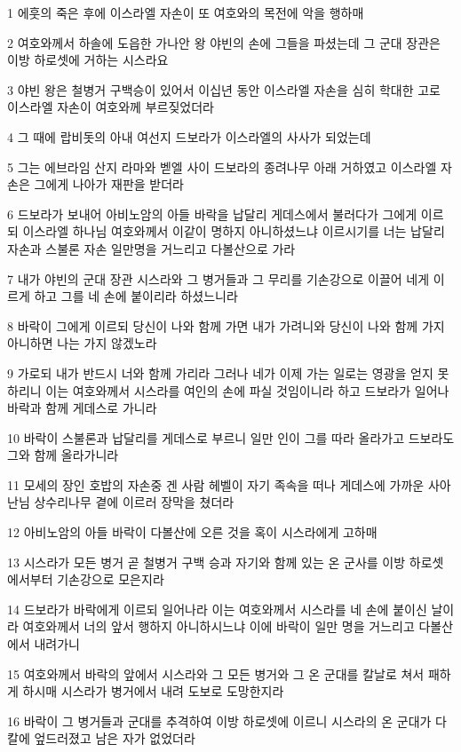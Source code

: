 \par 1 에훗의 죽은 후에 이스라엘 자손이 또 여호와의 목전에 악을 행하매
\par 2 여호와께서 하솔에 도읍한 가나안 왕 야빈의 손에 그들을 파셨는데 그 군대 장관은 이방 하로셋에 거하는 시스라요
\par 3 야빈 왕은 철병거 구백승이 있어서 이십년 동안 이스라엘 자손을 심히 학대한 고로 이스라엘 자손이 여호와께 부르짖었더라
\par 4 그 때에 랍비돗의 아내 여선지 드보라가 이스라엘의 사사가 되었는데
\par 5 그는 에브라임 산지 라마와 벧엘 사이 드보라의 종려나무 아래 거하였고 이스라엘 자손은 그에게 나아가 재판을 받더라
\par 6 드보라가 보내어 아비노암의 아들 바락을 납달리 게데스에서 불러다가 그에게 이르되 이스라엘 하나님 여호와께서 이같이 명하지 아니하셨느냐 이르시기를 너는 납달리 자손과 스불론 자손 일만명을 거느리고 다볼산으로 가라
\par 7 내가 야빈의 군대 장관 시스라와 그 병거들과 그 무리를 기손강으로 이끌어 네게 이르게 하고 그를 네 손에 붙이리라 하셨느니라
\par 8 바락이 그에게 이르되 당신이 나와 함께 가면 내가 가려니와 당신이 나와 함께 가지 아니하면 나는 가지 않겠노라
\par 9 가로되 내가 반드시 너와 함께 가리라 그러나 네가 이제 가는 일로는 영광을 얻지 못하리니 이는 여호와께서 시스라를 여인의 손에 파실 것임이니라 하고 드보라가 일어나 바락과 함께 게데스로 가니라
\par 10 바락이 스불론과 납달리를 게데스로 부르니 일만 인이 그를 따라 올라가고 드보라도 그와 함께 올라가니라
\par 11 모세의 장인 호밥의 자손중 겐 사람 헤벨이 자기 족속을 떠나 게데스에 가까운 사아난님 상수리나무 곁에 이르러 장막을 쳤더라
\par 12 아비노암의 아들 바락이 다볼산에 오른 것을 혹이 시스라에게 고하매
\par 13 시스라가 모든 병거 곧 철병거 구백 승과 자기와 함께 있는 온 군사를 이방 하로셋에서부터 기손강으로 모은지라
\par 14 드보라가 바락에게 이르되 일어나라 이는 여호와께서 시스라를 네 손에 붙이신 날이라 여호와께서 너의 앞서 행하지 아니하시느냐 이에 바락이 일만 명을 거느리고 다볼산에서 내려가니
\par 15 여호와께서 바락의 앞에서 시스라와 그 모든 병거와 그 온 군대를 칼날로 쳐서 패하게 하시매 시스라가 병거에서 내려 도보로 도망한지라
\par 16 바락이 그 병거들과 군대를 추격하여 이방 하로셋에 이르니 시스라의 온 군대가 다 칼에 엎드러졌고 남은 자가 없었더라
